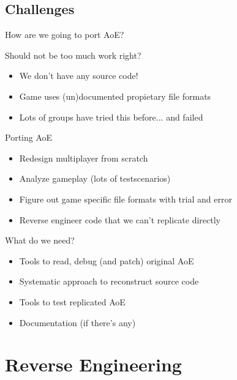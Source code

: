 \documentclass{beamer}
\begin{document}

\subsection{Challenges}

\begin{frame}{How are we going to port AoE?}

	Should not be too much work right?

	\begin{itemize}
		\item We don't have any source code!
		\item Game uses (un)documented propietary file formats
		\item Lots of groups have tried this before... and failed
	\end{itemize}

\end{frame}


\begin{frame}{Porting AoE}

	\begin{itemize}
		\item Redesign multiplayer from scratch
		\item Analyze gameplay (lots of testscenarios)
		\item Figure out game specific file formats with trial and error
		\item Reverse engineer code that we can't replicate directly
	\end{itemize}

\end{frame}


\begin{frame}{What do we need?}
	\begin{itemize}
		\item Tools to read, debug (and patch) original AoE
		\item Systematic approach to reconstruct source code
		\item Tools to test replicated AoE
		\item Documentation (if there's any)
	\end{itemize}

\end{frame}


\section{Reverse Engineering}
\end{document}
